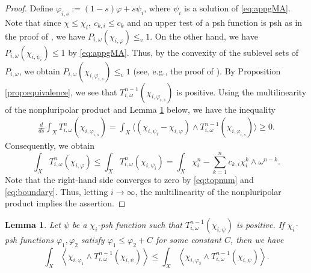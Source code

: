 \documentclass[10pt,a4paper]{amsart}
\numberwithin{equation}{section}
\newtheorem{lem}[equation]{Lemma}
\begin{document}
\begin{proof}
    Define $\varphi_{i,s}:=(1-s)\varphi+s\psi_i$, where $\psi_i$ is a solution of \eqref{eq:appgMA}. Note that since $\chi\le\chi_i, \ c_{k,i}\le c_k$ and an upper test of a psh function is psh as in the proof of \cite[Proposition 1.3]{EGZ}, we have $P_{i,\omega}(\chi_{i,\varphi})\le_v 1$. On the other hand, we have $P_{i,\omega}(\chi_{i,\psi_i})\le 1$ by \eqref{eq:appgMA}. Thus, by the convexity of the sublevel sets of $P_{i,\omega}$, we obtain $P_{i,\omega}(\chi_{i,\varphi_{i,s}})\le_v 1$ (see, e.g., the proof of \cite[Theorem 5.8]{CC}). By Proposition \ref{prop:equivalence}, we see that $T^{n-1}_{i,\omega}(\chi_{i,\varphi_{i,s}})$ is positive. Using the multilinearity of the nonpluripolar product and Lemma \ref{lem:ppineq} below, we have the inequality
    \begin{equation*}
        \begin{split}
            \frac{d}{ds}\int_X T^n_{i,\omega}(\chi_{i,\varphi_{i,s}})
            =\int_X \Big\langle(\chi_{i,\psi_i}-\chi_{i,\varphi})\wedge T^{n-1}_{i,\omega}(\chi_{i,\varphi_{i,s}})\Big\rangle\ge 0.
        \end{split}
    \end{equation*}
    Consequently, we obtain
    $$\int_X T^n_{i,\omega}(\chi_{i,\varphi})\le
    \int_X T^n_{i,\omega}(\chi_{i,\psi_i})=\int_X\chi_i^n-\sum_{k=1}^n c_{k,i}\chi_i^k\wedge\omega^{n-k}.$$
    Note that the right-hand side converges to zero by \eqref{eq:topnum} and \eqref{eq:boundary}. Thus, letting $i\to\infty$, the multilinearity of the nonpluripolar product implies the assertion.
\end{proof}


\begin{lem}\label{lem:ppineq}
    Let $\psi$ be a $\chi_i$-psh function such that $T^{n-1}_{i,\omega}(\chi_{i,\psi})$ is positive. If $\chi_i$-psh functions $\varphi_1,\varphi_2$ satisfy $\varphi_1\le\varphi_2+C$ for some constant $C$, then we have
    $$\int_X\left\langle\chi_{i,\varphi_1}\wedge T^{n-1}_{i,\omega}(\chi_{i,\psi})\right\rangle\le\int_X\left\langle\chi_{i,\varphi_2}\wedge T^{n-1}_{i,\omega}(\chi_{i,\psi})\right\rangle.$$
\end{lem}
\end{document}

